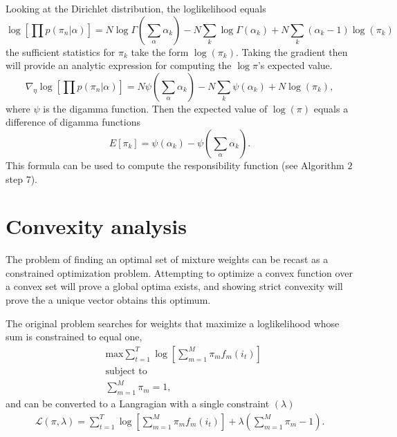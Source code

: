 \documentclass[12pt]{article}
\def\l{\left}
\def\r{\right}
\begin{document}
Looking at the Dirichlet distribution, the loglikelihood equals
\begin{equation}
  \log \l [ \prod p(\pi_{n}|\alpha) \r] = N \log \Gamma \l(\sum_{\alpha} \alpha_{k}\r) - N \sum_{k} \log \Gamma \l(\alpha_{k}\r) + N \sum_{k} (\alpha_{k}-1) \log(\pi_{k})
\end{equation}
the sufficient statistics for $\pi_{k}$ take the form $\log \l( \pi_{k}\r)$.
Taking the gradient then will provide an analytic expression for computing the $\log \pi$'s expected value.
\begin{equation}
 \nabla_{\eta} \log \l [ \prod p(\pi_{n}|\alpha) \r] = N \psi \l(\sum_{\alpha} \alpha_{k}\r) - N \sum_{k} \psi \l(\alpha_{k}\r) + N \log(\pi_{k}),
\end{equation}
where $\psi$ is the digamma function.
Then the expected value of $\log\l(\pi\r)$ equals a difference of digamma functions
\begin{equation}
  E\l[\pi_{k}\r] = \psi\l(\alpha_{k}\r) -  \psi \l(\sum_{\alpha} \alpha_{k}\r).
\end{equation}
This formula can be used to compute the responsibility function (see Algorithm $2$ step $7$).

\clearpage

\section{Convexity analysis}
\label{convexity}

The problem of finding an optimal set of mixture weights can be recast as a constrained optimization problem.
Attempting to optimize a convex function over a convex set will prove a global optima exists, and showing strict convexity will prove the a unique vector obtains this optimum.

The original problem searches for weights that maximize a loglikelihood whose sum is constrained to equal one,
\begin{align}
    &\text{max} \sum_{t=1}^{T} \log \l[ \sum_{m=1}^{M} \pi_mf_{m}(i_{t}) \r] \label{oFunc}\\
    &\text{subject to} \nonumber \\ 
    &   \sum_{m=1}^{M} \pi_{m} = 1 \nonumber,
\end{align}
and can be converted to a Langragian with a single constraint $(\lambda)$
\begin{align}
  \mathcal{L}(\pi,\lambda) = \sum_{t=1}^{T} \log \l[ \sum_{m=1}^{M} \pi_mf_{m}(i_{t}) \r]  +\lambda \l( \sum_{m=1}^{M} \pi_m-1 \r) \nonumber.
\end{align}
\end{document}
